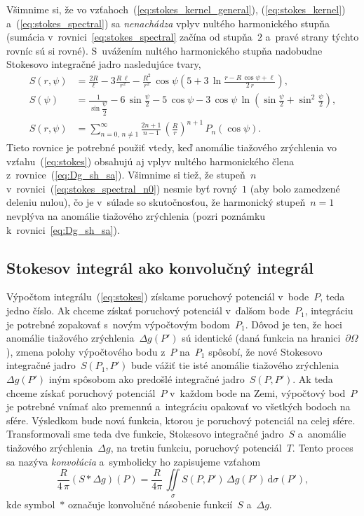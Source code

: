 \documentclass[a4paper, 12pt]{book}
\newcommand{\diff}{\mathrm d}
\begin{document}
Všimnime si, že vo vzťahoch~(\ref{eq:stokes_kernel_general}), 
(\ref{eq:stokes_kernel}) a~(\ref{eq:stokes_spectral}) sa \emph{nenachádza} 
vplyv nultého harmonického stupňa (sumácia v~rovnici~\ref{eq:stokes_spectral} 
začína od stupňa~$2$ a~pravé strany týchto rovníc sú si rovné).  S~uvážením 
nultého harmonického stupňa nadobudne Stokesovo integračné jadro nasledujúce 
tvary,
%
\begin{align}
S(r, \psi) &= \frac{2R}{\ell} - 3\frac{R \, \ell}{r^2} - \frac{R^2}{r^2} \, 
\cos\psi\left( 5 + 3 \, \ln \frac{r - R \, \cos\psi + \ell}{2 \, r} \right){,}
\label{eq:stokes_kernel_general_n0}
\\
%
S(\psi) &= \frac{1}{\sin\dfrac{\psi}{2}} - 6 \, \sin\frac{\psi}{2} - 5 \, 
\cos\psi - 3 \, \cos\psi \, \ln\left( \sin\frac{\psi}{2} + \sin^2\frac{\psi}{2} 
\right){,}
\label{eq:stokes_kernel_n0}
\\
%
S(r, \psi) &= \sum_{n = 0{,}\, n \neq 1}^{\infty} \frac{2n + 1}{n - 1} \, 
\left( \frac{R}{r} \right)^{n + 1} \, P_n(\cos\psi){.}
\label{eq:stokes_spectral_n0}
\end{align}
%
Tieto rovnice je potrebné použiť vtedy, keď anomálie tiažového zrýchlenia vo 
vzťahu~(\ref{eq:stokes}) obsahujú aj vplyv nultého harmonického člena 
z~rovnice~(\ref{eq:Dg_sh_sa}).  Všimnime si tiež, že stupeň~$n$ 
v~rovnici~(\ref{eq:stokes_spectral_n0}) nesmie byť rovný~$1$ (aby bolo 
zamedzené deleniu nulou), čo je v~súlade so skutočnosťou, že harmonický 
stupeň~$n = 1$ nevplýva na anomálie tiažového zrýchlenia (pozri poznámku 
k~rovnici~\ref{eq:Dg_sh_sa}).


\subsection{Stokesov integrál ako konvolučný integrál}
\label{sec:stokes_convolution}

Výpočtom integrálu~(\ref{eq:stokes}) získame poruchový potenciál v~bode~$P$, 
teda jedno číslo.  Ak chceme získať poruchový potenciál v~ďalšom bode~$P_1$, 
integráciu je potrebné zopakovať s~novým výpočtovým bodom~$P_1$.  Dôvod je ten, 
že hoci anomálie tiažového zrýchlenia~$\Delta g(P')$ sú identické (daná funkcia 
na hranici~$\partial\Omega$), zmena polohy výpočtového bodu z~$P$ na~$P_1$ 
spôsobí, že nové Stokesovo integračné jadro~$S(P_1, P')$ bude vážiť tie isté 
anomálie tiažového zrýchlenia~$\Delta g(P')$ iným spôsobom ako predošlé 
integračné jadro~$S(P, P')$.  Ak teda chceme získať poruchový potenciál~$P$ 
v~každom bode na Zemi, výpočtový bod~$P$ je potrebné vnímať ako premennú 
a~integráciu opakovať vo všetkých bodoch na sfére.  Výsledkom bude nová 
funkcia, ktorou je poruchový potenciál na celej sfére.  Transformovali sme teda 
dve funkcie, Stokesovo integračné jadro~$S$ a~anomálie tiažového 
zrýchlenia~$\Delta g$, na tretiu funkciu, poruchový potenciál~$T$.  Tento 
proces sa nazýva \emph{konvolúcia} a~symbolicky ho zapisujeme vzťahom
%
\begin{equation}
\label{eq:stokes_convolution}
\frac{R}{4 \, \pi}(S * \Delta g)(P) = \frac{R}{4\pi} \, \iint\limits_\sigma 
S(P, P') \, \Delta g(P') \, \diff\sigma(P'){,}
\end{equation}
%
kde symbol~$*$ označuje konvolučné násobenie funkcií~$S$ a~$\Delta g$.
\end{document}
